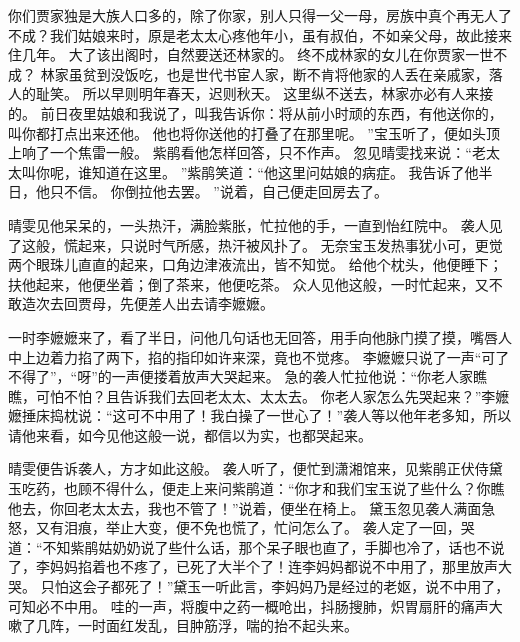 你们贾家独是大族人口多的，除了你家，别人只得一父一母，房族中真个再无人了不成？我们姑娘来时，原是老太太心疼他年小，虽有叔伯，不如亲父母，故此接来住几年。
大了该出阁时，自然要送还林家的。
终不成林家的女儿在你贾家一世不成？
林家虽贫到没饭吃，也是世代书宦人家，断不肯将他家的人丢在亲戚家，落人的耻笑。
所以早则明年春天，迟则秋天。
这里纵不送去，林家亦必有人来接的。
前日夜里姑娘和我说了，叫我告诉你：将从前小时顽的东西，有他送你的，叫你都打点出来还他。
他也将你送他的打叠了在那里呢。
”宝玉听了，便如头顶上响了一个焦雷一般。
紫鹃看他怎样回答，只不作声。
忽见晴雯找来说：“老太太叫你呢，谁知道在这里。
”紫鹃笑道：“他这里问姑娘的病症。
我告诉了他半日，他只不信。
你倒拉他去罢。
”说着，自己便走回房去了。
\par
晴雯见他呆呆的，一头热汗，满脸紫胀，忙拉他的手，一直到怡红院中。
袭人见了这般，慌起来，只说时气所感，热汗被风扑了。
无奈宝玉发热事犹小可，更觉两个眼珠儿直直的起来，口角边津液流出，皆不知觉。
给他个枕头，他便睡下；扶他起来，他便坐着；倒了茶来，他便吃茶。
众人见他这般，一时忙起来，又不敢造次去回贾母，先便差人出去请李嬷嬷。
\par
一时李嬷嬷来了，看了半日，问他几句话也无回答，用手向他脉门摸了摸，嘴唇人中上边着力掐了两下，掐的指印如许来深，竟也不觉疼。
李嬷嬷只说了一声“可了不得了”，“呀”的一声便搂着放声大哭起来。
急的袭人忙拉他说：“你老人家瞧瞧，可怕不怕？且告诉我们去回老太太、太太去。
你老人家怎么先哭起来？”李嬷嬷捶床捣枕说：“这可不中用了！我白操了一世心了！”袭人等以他年老多知，所以请他来看，如今见他这般一说，都信以为实，也都哭起来。
\par
晴雯便告诉袭人，方才如此这般。
袭人听了，便忙到潇湘馆来，见紫鹃正伏侍黛玉吃药，也顾不得什么，便走上来问紫鹃道：“你才和我们宝玉说了些什么？你瞧他去，你回老太太去，我也不管了！”说着，便坐在椅上。
黛玉忽见袭人满面急怒，又有泪痕，举止大变，便不免也慌了，忙问怎么了。
袭人定了一回，哭道：“不知紫鹃姑奶奶说了些什么话，那个呆子眼也直了，手脚也冷了，话也不说了，李妈妈掐着也不疼了，已死了大半个了！连李妈妈都说不中用了，那里放声大哭。
只怕这会子都死了！”黛玉一听此言，李妈妈乃是经过的老妪，说不中用了，可知必不中用。
哇的一声，将腹中之药一概呛出，抖肠搜肺，炽胃扇肝的痛声大嗽了几阵，一时面红发乱，目肿筋浮，喘的抬不起头来。
